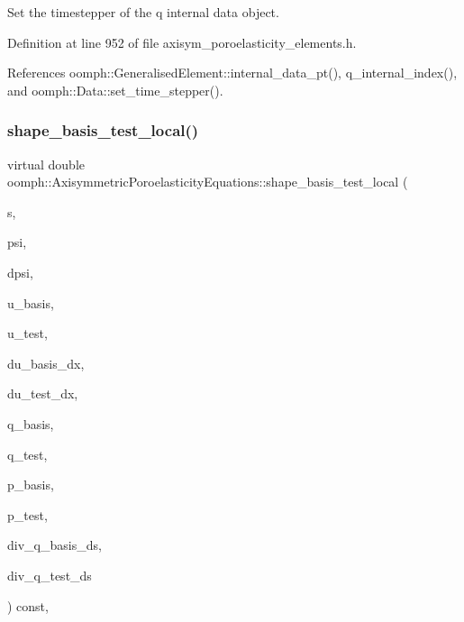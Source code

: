 Set the timestepper of the q internal data object. 



Definition at line 952 of file axisym\+\_\+poroelasticity\+\_\+elements.\+h.



References oomph\+::\+Generalised\+Element\+::internal\+\_\+data\+\_\+pt(), q\+\_\+internal\+\_\+index(), and oomph\+::\+Data\+::set\+\_\+time\+\_\+stepper().

\mbox{\label{classoomph_1_1AxisymmetricPoroelasticityEquations_a5514cde6de162cc6eb49fd9e5844500d}} 
\subsubsection{\texorpdfstring{shape\+\_\+basis\+\_\+test\+\_\+local()}{shape\_basis\_test\_local()}}
{\footnotesize\ttfamily virtual double oomph\+::\+Axisymmetric\+Poroelasticity\+Equations\+::shape\+\_\+basis\+\_\+test\+\_\+local (\begin{DoxyParamCaption}\item[{const \hyperlink{classoomph_1_1Vector}{Vector}$<$ double $>$ \&}]{s,  }\item[{\hyperlink{classoomph_1_1Shape}{Shape} \&}]{psi,  }\item[{\hyperlink{classoomph_1_1DShape}{D\+Shape} \&}]{dpsi,  }\item[{\hyperlink{classoomph_1_1Shape}{Shape} \&}]{u\+\_\+basis,  }\item[{\hyperlink{classoomph_1_1Shape}{Shape} \&}]{u\+\_\+test,  }\item[{\hyperlink{classoomph_1_1DShape}{D\+Shape} \&}]{du\+\_\+basis\+\_\+dx,  }\item[{\hyperlink{classoomph_1_1DShape}{D\+Shape} \&}]{du\+\_\+test\+\_\+dx,  }\item[{\hyperlink{classoomph_1_1Shape}{Shape} \&}]{q\+\_\+basis,  }\item[{\hyperlink{classoomph_1_1Shape}{Shape} \&}]{q\+\_\+test,  }\item[{\hyperlink{classoomph_1_1Shape}{Shape} \&}]{p\+\_\+basis,  }\item[{\hyperlink{classoomph_1_1Shape}{Shape} \&}]{p\+\_\+test,  }\item[{\hyperlink{classoomph_1_1Shape}{Shape} \&}]{div\+\_\+q\+\_\+basis\+\_\+ds,  }\item[{\hyperlink{classoomph_1_1Shape}{Shape} \&}]{div\+\_\+q\+\_\+test\+\_\+ds }\end{DoxyParamCaption}) const\hspace{0.3cm}{\ttfamily [protected]}, {}}



